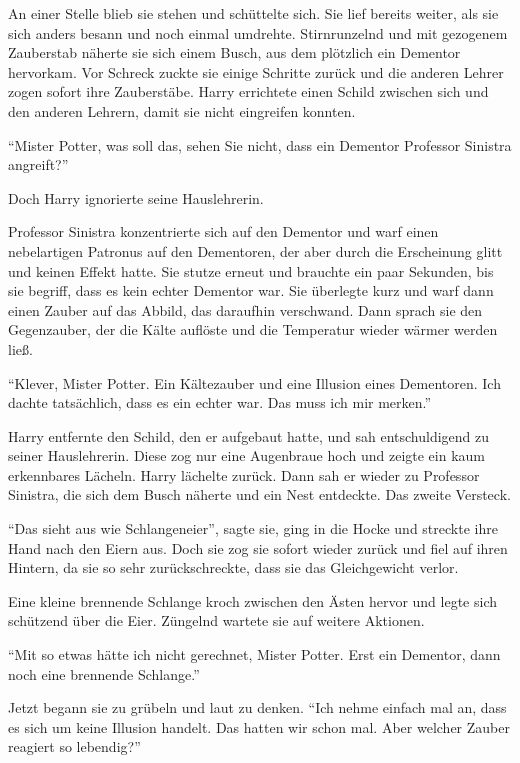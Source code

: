An einer Stelle blieb sie stehen und schüttelte sich. Sie lief bereits weiter, als sie sich anders besann und noch einmal umdrehte. Stirnrunzelnd und mit gezogenem Zauberstab näherte sie sich einem Busch, aus dem plötzlich ein Dementor hervorkam. Vor Schreck zuckte sie einige Schritte zurück und die anderen Lehrer zogen sofort ihre Zauberstäbe. Harry errichtete einen Schild zwischen sich und den anderen Lehrern, damit sie nicht eingreifen konnten.

\enquote{Mister Potter, was soll das, sehen Sie nicht, dass ein Dementor Professor Sinistra angreift?}

Doch Harry ignorierte seine Hauslehrerin.

Professor Sinistra konzentrierte sich auf den Dementor und warf einen nebelartigen Patronus auf den Dementoren, der aber durch die Erscheinung glitt und keinen Effekt hatte. Sie stutze erneut und brauchte ein paar Sekunden, bis sie begriff, dass es kein echter Dementor war. Sie überlegte kurz und warf dann einen Zauber auf das Abbild, das daraufhin verschwand. Dann sprach sie den Gegenzauber, der die Kälte auflöste und die Temperatur wieder wärmer werden ließ.

\enquote{Klever, Mister Potter. Ein Kältezauber und eine Illusion eines Dementoren. Ich dachte tatsächlich, dass es ein echter war. Das muss ich mir merken.}

Harry entfernte den Schild, den er aufgebaut hatte, und sah entschuldigend zu seiner Hauslehrerin. Diese zog nur eine Augenbraue hoch und zeigte ein kaum erkennbares Lächeln. Harry lächelte zurück. Dann sah er wieder zu Professor Sinistra, die sich dem Busch näherte und ein Nest entdeckte. Das zweite Versteck.

\enquote{Das sieht aus wie Schlangeneier}, sagte sie, ging in die Hocke und streckte ihre Hand nach den Eiern aus. Doch sie zog sie sofort wieder zurück und fiel auf ihren Hintern, da sie so sehr zurückschreckte, dass sie das Gleichgewicht verlor.

Eine kleine brennende Schlange kroch zwischen den Ästen hervor und legte sich schützend über die Eier. Züngelnd wartete sie auf weitere Aktionen.

\enquote{Mit so etwas hätte ich nicht gerechnet, Mister Potter. Erst ein Dementor, dann noch eine brennende Schlange.}

Jetzt begann sie zu grübeln und laut zu denken. \enquote{Ich nehme einfach mal an, dass es sich um keine Illusion handelt. Das hatten wir schon mal. Aber welcher Zauber reagiert so lebendig?}


